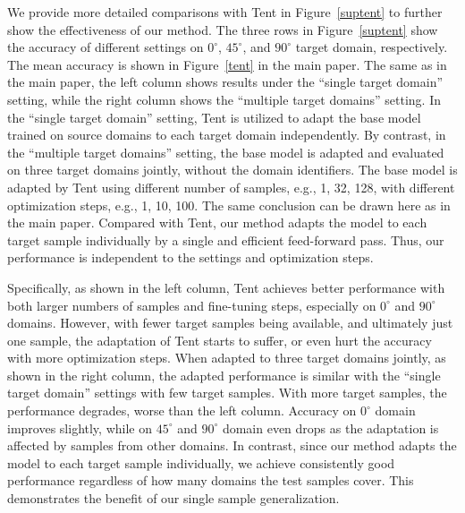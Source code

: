 \documentclass{article} \usepackage[table]{xcolor}
\begin{document}
We provide more detailed comparisons with Tent \cite{wang2021tent} in Figure~\ref{suptent} to further show the effectiveness of our method.
The three rows in Figure~\ref{suptent} show the accuracy of different settings on $0^\circ$, $45^\circ$, and $90^\circ$ target domain, respectively. The mean accuracy is shown in Figure~\ref{tent} in the main paper.
The same as in the main paper, the left column shows results under the ``single target domain'' setting, while the right column shows the ``multiple target domains'' setting.
In the ``single target domain'' setting, Tent is utilized to adapt the base model trained on source domains to each target domain independently.
By contrast, in the ``multiple target domains'' setting, the base model is adapted and evaluated on three target domains jointly, without the domain identifiers.
The base model is adapted by Tent using different number of samples, e.g., 1, 32, 128, with different optimization steps, e.g., 1, 10, 100.
The same conclusion can be drawn here as in the main paper.
Compared with Tent, our method adapts the model to each target sample individually by a single and efficient feed-forward pass. 
Thus, our performance is independent to the settings and optimization steps.

Specifically, as shown in the left column, Tent achieves better performance with both larger numbers of samples and fine-tuning steps, especially on $0^\circ$ and $90^\circ$ domains.
However, with fewer target samples being available, and ultimately just one sample, the adaptation of Tent starts to suffer, or even hurt the accuracy with more optimization steps.
When adapted to three target domains jointly, as shown in the right column, the adapted performance is similar with the ``single target domain'' settings with few target samples.
With more target samples, the performance degrades, worse than the left column. 
Accuracy on $0^\circ$ domain improves slightly, while on $45^\circ$ and $90^\circ$ domain even drops as the adaptation is affected by samples from other domains.
In contrast, since our method adapts the model to each target sample individually, we achieve consistently good performance regardless of how many domains the test samples cover. This demonstrates the benefit of our single sample generalization.
\end{document}
